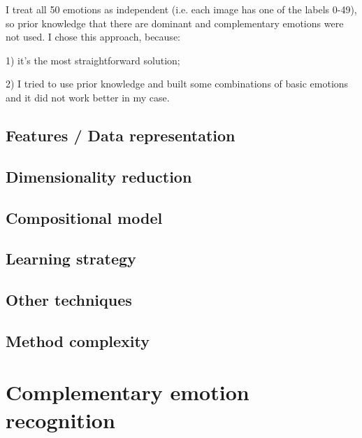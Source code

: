 \documentclass{article}
\begin{document}
I treat all 50 emotions as independent (i.e. each image has one of the labels 0-49), so prior knowledge that there are dominant and complementary emotions were not used.
I chose this approach, because: 

1) it's the most straightforward solution;

2) I tried to use prior knowledge and built some combinations of basic emotions and it did not work better in my case.

\subsection{Features / Data representation}

\subsection{Dimensionality reduction}

\subsection{Compositional model}

\subsection{Learning strategy}

\subsection{Other techniques}

\subsection{Method complexity}


\section{Complementary emotion recognition}
\end{document}
